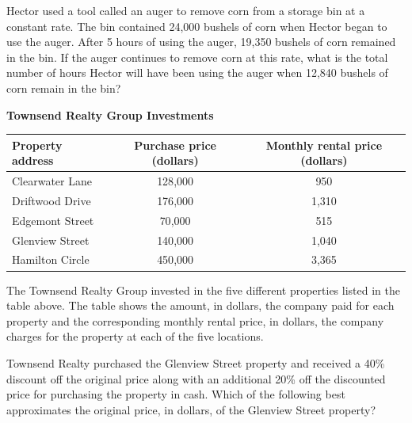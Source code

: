 \noindent\markforreview
\vspace{1em}


Hector used a tool called an auger to remove corn from a storage bin at a constant rate. The bin contained 24,000 bushels of corn when Hector began to use the auger. After 5 hours of using the auger, 19,350 bushels of corn remained in the bin. If the auger continues to remove corn at this rate, what is the total number of hours Hector will have been using the auger when 12,840 bushels of corn remain in the bin?

\vspace{0.75em}


\vspace{2em}
\newpage
\noindent\markforreview

\vspace{1em}

\begin{center}
\textbf{Townsend Realty Group Investments}

\vspace{0.75em}
\renewcommand{\arraystretch}{1.3}
\begin{tabular}{|l|c|c|}
\hline
\textbf{Property address} & \textbf{Purchase price (dollars)} & \textbf{Monthly rental price (dollars)} \\
\hline
Clearwater Lane & 128{,}000 & 950 \\
Driftwood Drive & 176{,}000 & 1{,}310 \\
Edgemont Street & 70{,}000 & 515 \\
Glenview Street & 140{,}000 & 1{,}040 \\
Hamilton Circle & 450{,}000 & 3{,}365 \\
\hline
\end{tabular}
\end{center}

\vspace{1em}

The Townsend Realty Group invested in the five different properties listed in the table above. The table shows the amount, in dollars, the company paid for each property and the corresponding monthly rental price, in dollars, the company charges for the property at each of the five locations.

Townsend Realty purchased the Glenview Street property and received a 40\% discount off the original price along with an additional 20\% off the discounted price for purchasing the property in cash. Which of the following best approximates the original price, in dollars, of the Glenview Street property?

